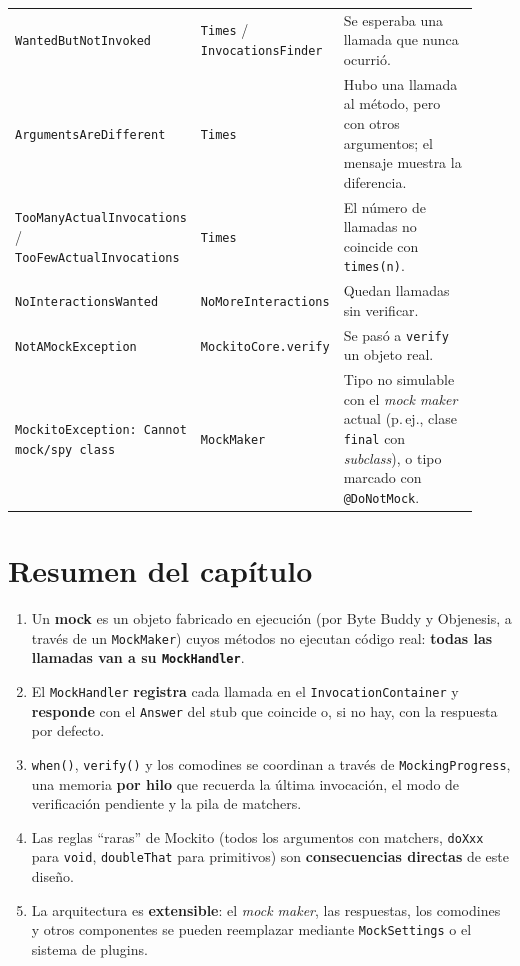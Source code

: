 \documentclass[11pt,a4paper,oneside]{report}
\newcommand{\code}[1]{\texttt{#1}}
\begin{document}
\begin{longtable}{>{\raggedright\arraybackslash}p{0.29\linewidth}>{\raggedright\arraybackslash}p{0.23\linewidth}>{\raggedright\arraybackslash}p{0.4\linewidth}}
\code{WantedButNotInvoked} & \code{Times} / \code{InvocationsFinder} & Se esperaba una llamada que nunca ocurrió.\\
\code{ArgumentsAreDifferent} & \code{Times} & Hubo una llamada al método, pero con otros argumentos; el mensaje muestra la diferencia.\\
\code{TooManyActual\allowbreak Invocations} / \code{TooFewActual\allowbreak Invocations} & \code{Times} & El número de llamadas no coincide con \code{times(n)}.\\
\code{NoInteractionsWanted} & \code{NoMoreInteractions} & Quedan llamadas sin verificar.\\
\code{NotAMockException} & \code{MockitoCore.verify} & Se pasó a \code{verify} un objeto real.\\
\code{MockitoException: Cannot mock/spy class} & \code{MockMaker} & Tipo no simulable con el \emph{mock maker} actual (p.\,ej., clase \code{final} con \emph{subclass}), o tipo marcado con \code{@DoNotMock}.\\
\bottomrule
\end{longtable}

\section{Resumen del capítulo}
\begin{idea}
\begin{enumerate}
  \item Un \textbf{mock} es un objeto fabricado en ejecución (por Byte Buddy y Objenesis, a través de un \code{MockMaker}) cuyos métodos no ejecutan código real: \textbf{todas las llamadas van a su \code{MockHandler}}.
  \item El \code{MockHandler} \textbf{registra} cada llamada en el \code{InvocationContainer} y \textbf{responde} con el \code{Answer} del stub que coincide o, si no hay, con la respuesta por defecto.
  \item \code{when()}, \code{verify()} y los comodines se coordinan a través de \code{MockingProgress}, una memoria \textbf{por hilo} que recuerda la última invocación, el modo de verificación pendiente y la pila de matchers.
  \item Las reglas ``raras'' de Mockito (todos los argumentos con matchers, \code{doXxx} para \code{void}, \code{doubleThat} para primitivos) son \textbf{consecuencias directas} de este diseño.
  \item La arquitectura es \textbf{extensible}: el \emph{mock maker}, las respuestas, los comodines y otros componentes se pueden reemplazar mediante \code{MockSettings} o el sistema de plugins.
\end{enumerate}
\end{idea}
\end{document}
